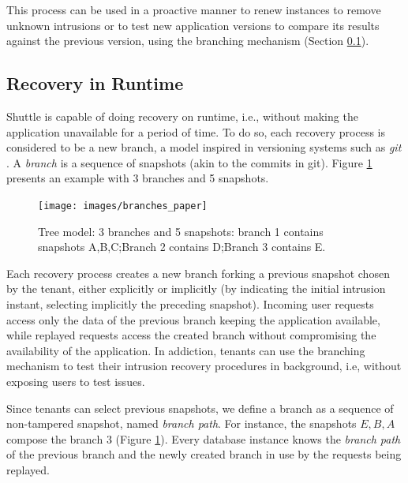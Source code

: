 This process can be used in a proactive manner to renew instances to remove unknown intrusions \cite{Sousa2010} or to test new application versions to compare its results against the previous version, using the branching mechanism (Section \ref{sec:recovery:runtime_recovery}).


\subsection{Recovery in Runtime}
\label{sec:recovery:runtime_recovery}
Shuttle is capable of doing recovery on runtime, i.e., without making the application unavailable for a period of time. To do so, each recovery process is considered to be a new branch, a model inspired in versioning systems such as \emph{git} \cite{git}. A \emph{branch} is a sequence of snapshots (akin to the commits in git). Figure \ref{fig:branches} presents an example with 3 branches and 5 snapshots.

\begin{figure}
  \centering
  \texttt{[image: images/branches\_paper]}
  \caption{\footnotesize{Tree model:} 3 branches and 5 snapshots: branch 1 contains snapshots A,B,C;\newline Branch 2 contains D;\newline Branch 3 contains E.}
  \label{fig:branches}
\end{figure}

Each recovery process creates a new branch forking a previous snapshot chosen by the tenant, either explicitly or implicitly (by indicating the initial intrusion instant, selecting implicitly the preceding snapshot). Incoming user requests access only the data of the previous branch keeping the application available, while replayed requests access the created branch without compromising the availability of the application. In addiction, tenants can use the branching mechanism to test their intrusion recovery procedures in background, i.e, without exposing users to test issues.

Since tenants can select previous snapshots, we define a branch as a sequence of non-tampered snapshot, named \emph{branch path}. For instance, the snapshots $E, B, A$ compose the branch 3 (Figure \ref{fig:branches}). Every database instance knows the \emph{branch path} of the previous branch and the newly created branch in use by the requests being replayed.

